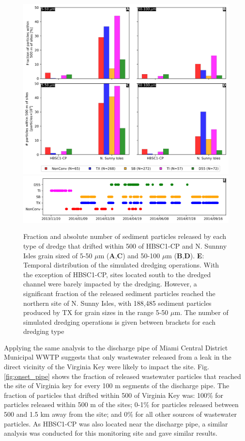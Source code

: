 \documentclass[preprint,12pt,authoryear]{elsarticle}
\begin{document}
\begin{figure}
    \centering
    \includegraphics[width=.85\textwidth]{figures/aggregated_with_absolute.png}
    \includegraphics[width=.85\textwidth]{figures/timeline.png}
    \caption{Fraction and absolute number of sediment particles released by each type of dredge that drifted within 500 of HBSC1-CP and N. Sunnny Isles grain sized of 5-50 $\mu$m (\textbf{A},\textbf{C}) and 50-100 $\mu$m (\textbf{B},\textbf{D}). \textbf{E}: Temporal distribution of the simulated dredging operations. With the exception of HBSC1-CP, sites located south to the dredged channel were barely impacted by the dredging. However, a significant fraction of the released sediment particles reached the northern site of N. Sunny Isles, with 188,485 sediment particles produced by TX for grain sizes in the range 5-50 $\mu$m. The number of simulated dredging operations is given between brackets for each dredging type}
    \label{fig:onset_bar}
\end{figure}

Applying the same analysis to the discharge pipe of Miami Central District Municipal WWTP suggests that only wastewater released from a leak in the direct vicinity of the Virginia Key were likely to impact the site. Fig. \ref{fig:onset_pipe} shows the fraction of released wastewater particles that reached the site of Virginia key for every 100 m segments of the discharge pipe. The fraction of particles that drifted within 500 of Virginia Key was: 100\% for particles released within 500 m of the sites; 0-1\% for particles released between 500 and 1.5 km away from the site; and 0\% for all other sources of wastewater particles. As HBSC1-CP was also located near the discharge pipe, a similar analysis was conducted for this monitoring site and gave similar results.
\end{document}
